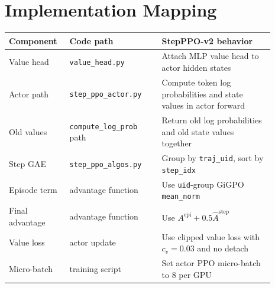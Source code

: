 \documentclass[10pt]{article}
\begin{document}
\section{Implementation Mapping}
\begin{table}[h]
\centering
\small
\begin{tabular}{>{\raggedright\arraybackslash}p{0.18\linewidth}>{\raggedright\arraybackslash}p{0.32\linewidth}>{\raggedright\arraybackslash}p{0.39\linewidth}}
\toprule
Component & Code path & StepPPO-v2 behavior \\
\midrule
Value head & \texttt{value\_head.py} & Attach MLP value head to actor hidden states \\
Actor path & \texttt{step\_ppo\_actor.py} & Compute token log probabilities and state values in actor forward \\
Old values & \texttt{compute\_log\_prob} path & Return old log probabilities and old state values together \\
Step GAE & \texttt{step\_ppo\_algos.py} & Group by \texttt{traj\_uid}, sort by \texttt{step\_idx} \\
Episode term & advantage function & Use \texttt{uid}-group GiGPO \texttt{mean\_norm} \\
Final advantage & advantage function & Use $A^{\mathrm{epi}}+0.5\widehat A^{\mathrm{step}}$ \\
Value loss & actor update & Use clipped value loss with $c_v=0.03$ and no detach \\
Micro-batch & training script & Set actor PPO micro-batch to $8$ per GPU \\
\bottomrule
\end{tabular}
\end{table}
\end{document}
